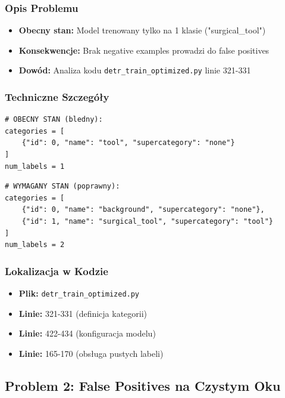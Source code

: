 \documentclass[12pt,a4paper]{article}
\begin{document}
\subsubsection{Opis Problemu}

\begin{itemize}
    \item \textbf{Obecny stan:} Model trenowany tylko na 1 klasie ("surgical\_tool")
    \item \textbf{Konsekwencje:} Brak negative examples prowadzi do false positives
    \item \textbf{Dowód:} Analiza kodu \texttt{detr\_train\_optimized.py} linie 321-331
\end{itemize}

\subsubsection{Techniczne Szczegóły}

\begin{lstlisting}[caption={Obecny stan (błędny)},label={lst:current_state}]
# OBECNY STAN (bledny):
categories = [
    {"id": 0, "name": "tool", "supercategory": "none"}
]
num_labels = 1
\end{lstlisting}

\begin{lstlisting}[caption={Wymagany stan (poprawny)},label={lst:required_state}]
# WYMAGANY STAN (poprawny):
categories = [
    {"id": 0, "name": "background", "supercategory": "none"},
    {"id": 1, "name": "surgical_tool", "supercategory": "tool"}
]
num_labels = 2
\end{lstlisting}

\subsubsection{Lokalizacja w Kodzie}

\begin{itemize}
    \item \textbf{Plik:} \texttt{detr\_train\_optimized.py}
    \item \textbf{Linie:} 321-331 (definicja kategorii)
    \item \textbf{Linie:} 422-434 (konfiguracja modelu)
    \item \textbf{Linie:} 165-170 (obsługa pustych labeli)
\end{itemize}

\subsection{Problem 2: False Positives na Czystym Oku}
\end{document}
